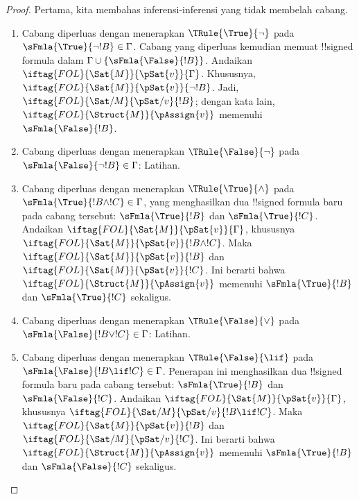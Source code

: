 \documentclass[../../../include/open-logic-section]{subfiles}
\begin{document}
\begin{proof}
Pertama, kita membahas inferensi-inferensi yang tidak membelah cabang.
\begin{enumerate}
\item Cabang diperluas dengan menerapkan $\TRule{\True}{\lnot}$ pada
  $\sFmla{\True}{\lnot !B} \in \Gamma$. Cabang yang diperluas kemudian
  memuat !!{signed formula} dalam $\Gamma \cup
  \{\sFmla{\False}{!B}\}$. Andaikan
  $\iftag{FOL}{\Sat{M}}{\pSat{v}}{\Gamma}$. Khususnya,
  $\iftag{FOL}{\Sat{M}}{\pSat{v}}{\lnot !B}$. Jadi,
  $\iftag{FOL}{\Sat/{M}}{\pSat/{v}}{!B}$; dengan kata lain,
  $\iftag{FOL}{\Struct{M}}{\pAssign{v}}$ memenuhi
  $\sFmla{\False}{!B}$.
\item Cabang diperluas dengan menerapkan $\TRule{\False}{\lnot}$ pada
  $\sFmla{\False}{\lnot !B} \in \Gamma$: Latihan.
\item Cabang diperluas dengan menerapkan $\TRule{\True}{\land}$ pada
  $\sFmla{\True}{!B \land !C} \in \Gamma$, yang menghasilkan dua
  !!{signed formula} baru pada cabang tersebut: $\sFmla{\True}{!B}$ dan
  $\sFmla{\True}{!C}$. Andaikan
  $\iftag{FOL}{\Sat{M}}{\pSat{v}}{\Gamma}$, khususnya
  $\iftag{FOL}{\Sat{M}}{\pSat{v}}{!B \land !C}$. Maka
  $\iftag{FOL}{\Sat{M}}{\pSat{v}}{!B}$ dan
  $\iftag{FOL}{\Sat{M}}{\pSat{v}}{!C}$. Ini berarti bahwa
  $\iftag{FOL}{\Struct{M}}{\pAssign{v}}$ memenuhi
  $\sFmla{\True}{!B}$ dan $\sFmla{\True}{!C}$ sekaligus.
\item Cabang diperluas dengan menerapkan $\TRule{\False}{\lor}$ pada
  $\sFmla{\False}{!B \lor !C} \in \Gamma$: Latihan.
\item Cabang diperluas dengan menerapkan $\TRule{\False}{\lif}$ pada
  $\sFmla{\False}{!B \lif !C} \in \Gamma$. Penerapan ini menghasilkan
  dua !!{signed formula} baru pada cabang tersebut:
  $\sFmla{\True}{!B}$ dan $\sFmla{\False}{!C}$. Andaikan
  $\iftag{FOL}{\Sat{M}}{\pSat{v}}{\Gamma}$, khususnya
  $\iftag{FOL}{\Sat/{M}}{\pSat/{v}}{!B \lif !C}$. Maka
  $\iftag{FOL}{\Sat{M}}{\pSat{v}}{!B}$ dan
  $\iftag{FOL}{\Sat/{M}}{\pSat/{v}}{!C}$. Ini berarti bahwa
  $\iftag{FOL}{\Struct{M}}{\pAssign{v}}$ memenuhi
  $\sFmla{\True}{!B}$ dan $\sFmla{\False}{!C}$ sekaligus.

\end{enumerate}
\end{proof}
\end{document}
